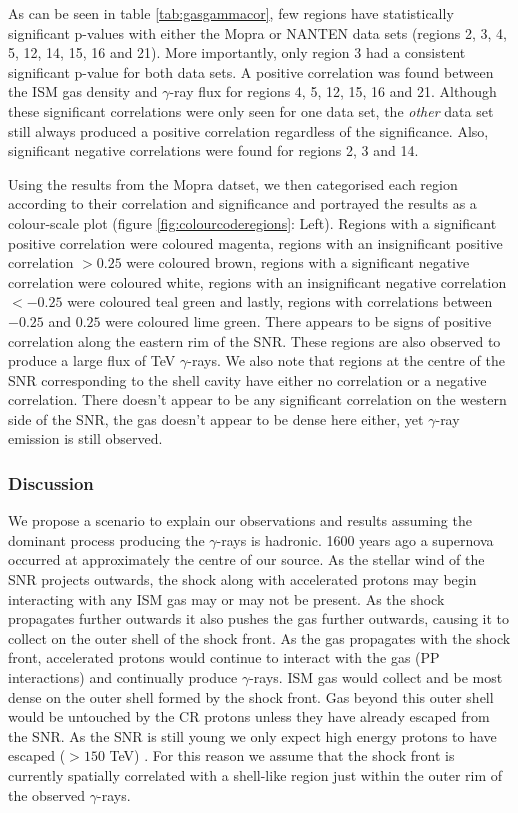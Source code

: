\documentclass[12pt,a4paper]{article}
\begin{document}
As can be seen in table \ref{tab:gasgammacor}, few regions have statistically significant p-values with either the Mopra or NANTEN data sets (regions 2, 3, 4, 5, 12, 14, 15, 16 and 21). More importantly, only region 3 had a consistent significant p-value for both data sets. A positive correlation was found between the ISM gas density and $\gamma$-ray flux for regions 4, 5, 12, 15, 16 and 21. Although these significant correlations were only seen for one data set, the \textit{other} data set still always produced a positive correlation regardless of the significance. Also, significant negative correlations were found for regions 2, 3 and 14. 

Using the results from the Mopra datset, we then categorised each region according to their correlation and significance and portrayed the results as a colour-scale plot (figure \ref{fig:colourcoderegions}: Left). Regions with a significant positive correlation were coloured magenta, regions with an insignificant positive correlation $> 0.25$ were coloured brown, regions with a significant negative correlation were coloured white, regions with an insignificant negative correlation $ < -0.25$ were coloured teal green and lastly, regions with correlations between $-0.25$ and $0.25$ were coloured lime green. There appears to be signs of positive correlation along the eastern rim of the SNR. These regions are also observed to produce a large flux of TeV $\gamma$-rays. We also note that regions at the centre of the SNR corresponding to the shell cavity have either no correlation or a negative correlation. There doesn't appear to be any significant correlation on the western side of the SNR, the gas doesn't appear to be dense here either, yet $\gamma$-ray emission is still observed.

\subsubsection{Discussion}
We propose a scenario to explain our observations and results assuming the dominant process producing the $\gamma$-rays is hadronic. 1600 years ago a supernova occurred at approximately the centre of our source. As the stellar wind of the SNR projects outwards, the shock along with accelerated protons may begin interacting with any ISM gas may or may not be present. As the shock propagates further outwards it also pushes the gas further outwards, causing it to collect on the outer shell of the shock front. As the gas propagates with the shock front, accelerated protons would continue to interact with the gas (PP interactions) and continually produce $\gamma$-rays. ISM gas would collect and be most dense on the outer shell formed by the shock front. Gas beyond this outer shell would be untouched by the CR protons unless they have already escaped from the SNR. As the SNR is still young we only expect high energy protons to have escaped ($>150$ TeV) \citep{2010PASJ...62.1127C}. For this reason we assume that the shock front is currently spatially correlated with a shell-like region just within the outer rim of the observed $\gamma$-rays.
\end{document}
